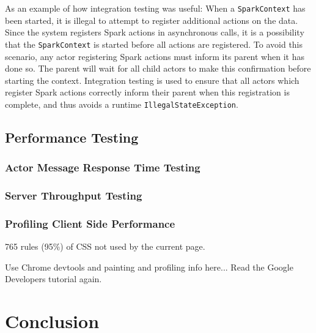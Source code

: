 \documentclass{l4proj}
\newcommand{\code}[1]{\texttt{#1}}
\begin{document}
    As an example of how integration testing was useful: When a \code{SparkContext} has been started, it is illegal to attempt to register additional actions on the data. Since the system registers Spark actions in asynchronous calls, it is a possibility that the \code{SparkContext} is started before all actions are registered. To avoid this scenario, any actor registering Spark actions must inform its parent when it has done so. The parent will wait for all child actors to make this confirmation before starting the context. Integration testing is used to ensure that all actors which register Spark actions correctly inform their parent when this registration is complete, and thus avoids a runtime \code{IllegalStateException}.
    
    

\section{Performance Testing}

    \subsection{Actor Message Response Time Testing}

    \subsection{Server Throughput Testing}

    \subsection{Profiling Client Side Performance}
    
    
    765 rules (95\%) of CSS not used by the current page.
    
    Use Chrome devtools and painting and profiling info here... Read the Google Developers tutorial again.
        
    
    



\chapter{Conclusion}

    
\end{document}
